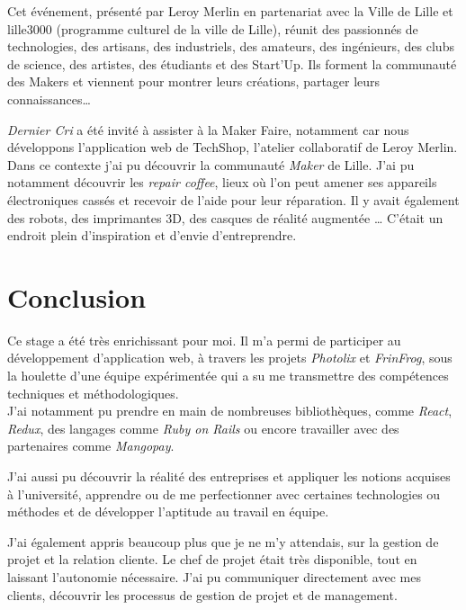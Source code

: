 \documentclass[12pt,a4paper]{article}
\begin{document}
  \bigskip

  Cet événement, présenté par Leroy Merlin en partenariat avec la Ville de
  Lille et lille3000 (programme culturel de la ville de Lille), réunit des
  passionnés de technologies, des artisans, des industriels, des amateurs,
  des ingénieurs, des clubs de science, des artistes, des étudiants et des
  Start'Up. Ils forment la communauté des Makers et viennent pour montrer
  leurs créations, partager leurs connaissances\ldots{}

  \bigskip

  \emph{Dernier Cri} a été invité à assister à la Maker Faire, notamment
  car nous développons l'application web de TechShop, l'atelier
  collaboratif de Leroy Merlin. Dans ce contexte j'ai pu découvrir la
  communauté \emph{Maker} de Lille. J'ai pu notamment découvrir les
  \emph{repair coffee}, lieux où l'on peut amener ses appareils
  électroniques cassés et recevoir de l'aide pour leur réparation. Il y
  avait également des robots, des imprimantes 3D, des casques de réalité
  augmentée \ldots{} C'était un endroit plein d'inspiration et d'envie
  d'entreprendre.

  \newpage

  \section{Conclusion}\label{conclusion-2}

  \bigskip

  Ce stage a été très enrichissant pour moi. Il m'a permi de participer au
  développement d'application web, à travers les projets \emph{Photolix}
  et \emph{FrinFrog}, sous la houlette d'une équipe expérimentée qui a su
  me transmettre des compétences techniques et méthodologiques.\\
  J'ai notamment pu prendre en main de nombreuses bibliothèques, comme
  \emph{React}, \emph{Redux}, des langages comme \emph{Ruby on Rails} ou
  encore travailler avec des partenaires comme \emph{Mangopay}.

  \bigskip

  J'ai aussi pu découvrir la réalité des entreprises et appliquer les
  notions acquises à l'université, apprendre ou de me perfectionner avec
  certaines technologies ou méthodes et de développer l'aptitude au
  travail en équipe.

  \bigskip

  J'ai également appris beaucoup plus que je ne m'y attendais, sur la
  gestion de projet et la relation cliente. Le chef de projet était très
  disponible, tout en laissant l'autonomie nécessaire. J'ai pu communiquer
  directement avec mes clients, découvrir les processus de gestion de
  projet et de management.
\end{document}
